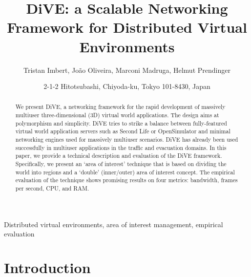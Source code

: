 \documentclass[]{elsarticle}
\begin{document}
\begin{frontmatter}

\title{DiVE: a Scalable Networking Framework for Distributed Virtual Environments}

\author{Tristan Imbert, Jo\~{a}o Oliveira, Marconi Madruga, Helmut Prendinger}
\address{National Institute of Informatics}

\author[mymainaddress]{2-1-2 Hitotsubashi, Chiyoda-ku, Tokyo 101-8430, Japan}


\begin{abstract}
We present DiVE, a networking framework for the rapid development of massively multiuser three-dimensional (3D) virtual world applications. The design aims at polymorphism and simplicity. DiVE tries to strike a balance between fully-featured virtual world application servers such as Second Life or OpenSimulator and minimal networking engines used for massively multiuser scenarios. DiVE has already been used successfully in multiuser applications in the traffic and evacuation domains. In this paper, we provide a technical description and evaluation of the DiVE framework. Specifically, we present an `area of interest' technique that is based on dividing the world into regions and a `double' (inner/outer) area of interest concept. The empirical evaluation of the technique shows promising results on four metrics: bandwidth, frames per second, CPU, and RAM.
\end{abstract}

\begin{keyword}
Distributed virtual environments, area of interest management, empirical evaluation
\end{keyword}

\end{frontmatter}

\linenumbers

\section{Introduction}
%
%
%
%
\end{document}
